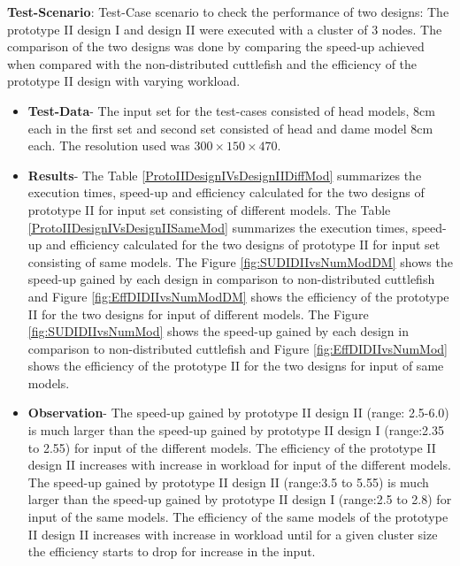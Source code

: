 \textbf{Test-Scenario}: Test-Case scenario to check the performance of two designs: The prototype II design I and design II were executed with a cluster of 3 nodes. The comparison of the two designs was done by comparing the speed-up achieved when compared with the non-distributed cuttlefish and the efficiency of the prototype II design with varying workload. 
\begin{itemize}
\item \textbf{Test-Data}- The input set for the test-cases consisted of head models, 8cm each in the first set and second set consisted of head and dame model 8cm each. The resolution used was \begin{math} 300 \times 150 \times 470 \end{math}. 
\item \textbf{Results}- The Table \ref{ProtoIIDesignIVsDesignIIDiffMod} summarizes the execution times, speed-up and efficiency calculated for the two designs of prototype II for input set consisting of different models. The Table \ref{ProtoIIDesignIVsDesignIISameMod} summarizes the execution times, speed-up and efficiency calculated for the two designs of prototype II for input set consisting of same models. The Figure \ref{fig:SUDIDIIvsNumModDM} shows the speed-up gained by each design in comparison to non-distributed cuttlefish and Figure \ref{fig:EffDIDIIvsNumModDM} shows the efficiency of the prototype II for the two designs for input of different models. The Figure \ref{fig:SUDIDIIvsNumMod} shows the speed-up gained by each design in comparison to non-distributed cuttlefish and Figure \ref{fig:EffDIDIIvsNumMod}  shows the efficiency of the prototype II for the two designs for input of same models.
\item \textbf{Observation}- The speed-up gained by prototype II design II (range: 2.5-6.0) is much larger than the speed-up gained by prototype II design I (range:2.35 to 2.55) for input of the different models. The efficiency of the prototype II design II increases with increase in workload for input of the different models. The speed-up gained by prototype II design II (range:3.5 to 5.55) is much larger than the speed-up gained by prototype II design I (range:2.5 to 2.8) for input of the same models. The efficiency of the same models of the prototype II design II increases with increase in workload until for a given cluster size the efficiency starts to drop for increase in the input.   
\end{itemize}



